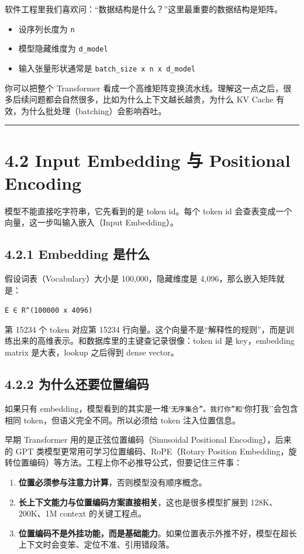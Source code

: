 软件工程里我们喜欢问：``数据结构是什么？''这里最重要的数据结构是矩阵。


\begin{itemize}[leftmargin=2em]
\item 设序列长度为 \texttt{n}
\item 模型隐藏维度为 \texttt{d\_model}
\item 输入张量形状通常是 \texttt{batch\_size x n x d\_model}
\end{itemize}

你可以把整个 Transformer 看成一个高维矩阵变换流水线。理解这一点之后，很多后续问题都会自然很多，比如为什么上下文越长越贵，为什么 KV Cache 有效，为什么批处理（batching）会影响吞吐。


\bigskip\hrule\bigskip

\section{4.2 Input Embedding 与 Positional Encoding}

模型不能直接吃字符串，它先看到的是 token id。每个 token id 会查表变成一个向量，这一步叫输入嵌入（Input Embedding）。


\subsection{4.2.1 Embedding 是什么}

假设词表（Vocabulary）大小是 100,000，隐藏维度是 4,096，那么嵌入矩阵就是：


\texttt{E ∈ R\textasciicircum{}(100000 x 4096)}


第 15234 个 token 对应第 15234 行向量。这个向量不是``解释性的规则''，而是训练出来的高维表示。和数据库里的主键查记录很像：token id 是 key，embedding matrix 是大表，lookup 之后得到 dense vector。


\subsection{4.2.2 为什么还要位置编码}

如果只有 embedding，模型看到的其实是一堆`\texttt{无序集合''。}\texttt{我打你''和}`你打我''会包含相同 token，但语义完全不同。所以必须给 token 注入位置信息。


早期 Transformer 用的是正弦位置编码（Sinusoidal Positional Encoding），后来的 GPT 类模型更常用可学习位置编码、RoPE（Rotary Position Embedding，旋转位置编码）等方法。工程上你不必推导公式，但要记住三件事：


\begin{enumerate}[leftmargin=2em]
\item \textbf{位置必须参与注意力计算}，否则模型没有顺序概念。
\item \textbf{长上下文能力与位置编码方案直接相关}，这也是很多模型扩展到 128K、200K、1M context 的关键工程点。
\item \textbf{位置编码不是外挂功能，而是基础能力}。如果位置表示外推不好，模型在超长上下文时会变笨、定位不准、引用错段落。
\end{enumerate}

